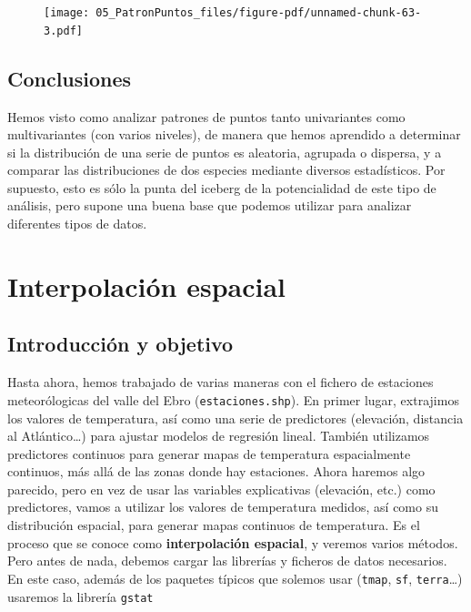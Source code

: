 \documentclass[
  letterpaper,
  DIV=11,
  numbers=noendperiod]{scrreprt}
\begin{document}
\begin{figure}[H]

{\centering \texttt{[image: 05\_PatronPuntos\_files/figure-pdf/unnamed-chunk-63-3.pdf]}

}

\end{figure}

\hypertarget{conclusiones-1}{%
\section{Conclusiones}\label{conclusiones-1}}

Hemos visto como analizar patrones de puntos tanto univariantes como
multivariantes (con varios niveles), de manera que hemos aprendido a
determinar si la distribución de una serie de puntos es aleatoria,
agrupada o dispersa, y a comparar las distribuciones de dos especies
mediante diversos estadísticos. Por supuesto, esto es sólo la punta del
iceberg de la potencialidad de este tipo de análisis, pero supone una
buena base que podemos utilizar para analizar diferentes tipos de datos.

\hypertarget{sec-Interpolation}{%
\chapter{Interpolación espacial}\label{sec-Interpolation}}

\hypertarget{introducciuxf3n-y-objetivo}{%
\section{Introducción y objetivo}\label{introducciuxf3n-y-objetivo}}

Hasta ahora, hemos trabajado de varias maneras con el fichero de
estaciones meteorólogicas del valle del Ebro (\texttt{estaciones.shp}).
En primer lugar, extrajimos los valores de temperatura, así como una
serie de predictores (elevación, distancia al Atlántico\ldots) para
ajustar modelos de regresión lineal. También utilizamos predictores
continuos para generar mapas de temperatura espacialmente continuos, más
allá de las zonas donde hay estaciones. Ahora haremos algo parecido,
pero en vez de usar las variables explicativas (elevación, etc.) como
predictores, vamos a utilizar los valores de temperatura medidos, así
como su distribución espacial, para generar mapas continuos de
temperatura. Es el proceso que se conoce como \textbf{interpolación
espacial}, y veremos varios métodos. Pero antes de nada, debemos cargar
las librerías y ficheros de datos necesarios. En este caso, además de
los paquetes típicos que solemos usar (\texttt{tmap}, \texttt{sf},
\texttt{terra}\ldots) usaremos la librería \texttt{gstat}
\end{document}
